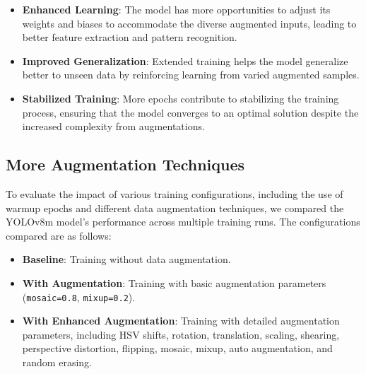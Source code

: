 \documentclass[conference]{IEEEtran}
\begin{document}
\begin{itemize}
    \item \textbf{Enhanced Learning}: The model has more opportunities to adjust its weights and biases to accommodate the diverse augmented inputs, leading to better feature extraction and pattern recognition.
    \item \textbf{Improved Generalization}: Extended training helps the model generalize better to unseen data by reinforcing learning from varied augmented samples.
    \item \textbf{Stabilized Training}: More epochs contribute to stabilizing the training process, ensuring that the model converges to an optimal solution despite the increased complexity from augmentations.
\end{itemize}

\subsection{More Augmentation Techniques}

To evaluate the impact of various training configurations, including the use of warmup epochs and different data augmentation techniques, we compared the YOLOv8m model's performance across multiple training runs. The configurations compared are as follows:

\begin{itemize}
    \item \textbf{Baseline}: Training without data augmentation.
    \item \textbf{With Augmentation}: Training with basic augmentation parameters (\texttt{mosaic=0.8}, \texttt{mixup=0.2}).
    \item \textbf{With Enhanced Augmentation}: Training with detailed augmentation parameters, including HSV shifts, rotation, translation, scaling, shearing, perspective distortion, flipping, mosaic, mixup, auto augmentation, and random erasing.
\end{itemize}

\begin{table}[htbp]
    \centering
    \caption{Comparison of YOLOv8m Performance Across Different Training Configurations}
    \label{tab:enchanced_augmentation_comparison}
\end{table}
\end{document}

